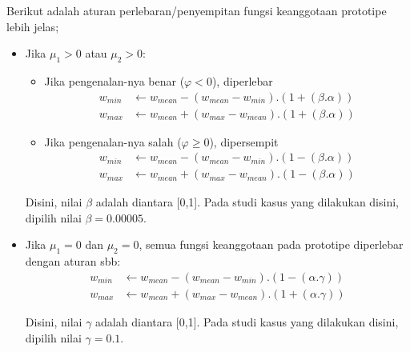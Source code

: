 \noindent
Berikut adalah aturan perlebaran/penyempitan fungsi keanggotaan prototipe lebih
jelas;
\begin{itemize}
  \item Jika  $\mu_1 > 0$ atau $\mu_2 > 0$:
  \begin{itemize}
    \item Jika pengenalan-nya benar ($\varphi < 0$), diperlebar
    	\begin{align}
    	w_{min} &\leftarrow w_{mean} - (w_{mean} - w_{min}) . (1 + (\beta .
    	\alpha)) \nonumber \\
    	w_{max} &\leftarrow w_{mean} + (w_{max} - w_{mean}) . (1 + (\beta .
    	\alpha)) 
    	\end{align}
    \item Jika pengenalan-nya salah ($\varphi \geq 0$), dipersempit
    	\begin{align}
    	w_{min} &\leftarrow w_{mean} - (w_{mean} - w_{min}) . (1 - (\beta .
    	\alpha)) \nonumber \\
    	w_{max} &\leftarrow w_{mean} + (w_{max} - w_{mean}) . (1 - (\beta .
    	\alpha)) 
    	\end{align}
  \end{itemize}
  Disini, nilai $\beta$ adalah diantara [0,1]. Pada studi kasus yang dilakukan
  disini, dipilih nilai $\beta = 0.00005$.
  
  \item Jika  $\mu_1=0$ dan $\mu_2=0$, semua fungsi keanggotaan pada prototipe
  diperlebar dengan aturan sbb:
  	\begin{align}
	w_{min} &\leftarrow w_{mean} - (w_{mean} - w_{min}) . (1 - (\alpha .
	\gamma)) \nonumber \\ 
	w_{max} &\leftarrow w_{mean} + (w_{max} - w_{mean})
	. (1 + (\alpha . \gamma)) 
	\end{align}
	
	Disini, nilai $\gamma$ adalah diantara [0,1]. Pada studi kasus yang dilakukan
	disini, dipilih nilai $\gamma = 0.1$.
\end{itemize}  

